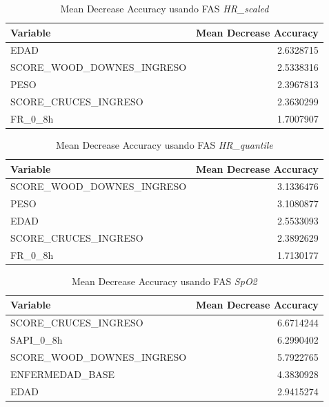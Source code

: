 \begin{table}[H]
    \centering
    \begin{tabular}{lr}
        \toprule
        \textbf{Variable} & \textbf{Mean Decrease Accuracy} \\
        \midrule
        EDAD & 2.6328715 \\
        SCORE\_WOOD\_DOWNES\_INGRESO & 2.5338316 \\
        PESO & 2.3967813 \\
        SCORE\_CRUCES\_INGRESO & 2.3630299 \\
        FR\_0\_8h & 1.7007907 \\
        \bottomrule
    \end{tabular}
    \caption{Mean Decrease Accuracy usando FAS \textit{HR\_scaled}}
\end{table}

\begin{table}[H]
    \centering
    \begin{tabular}{lr}
        \toprule
        \textbf{Variable} & \textbf{Mean Decrease Accuracy} \\
        \midrule
        SCORE\_WOOD\_DOWNES\_INGRESO & 3.1336476 \\
        PESO & 3.1080877 \\
        EDAD & 2.5533093 \\
        SCORE\_CRUCES\_INGRESO & 2.3892629 \\
        FR\_0\_8h & 1.7130177 \\
        \bottomrule
    \end{tabular}
    \caption{Mean Decrease Accuracy usando FAS \textit{HR\_quantile}} 
\end{table}

\begin{table}[H]
    \centering
    \begin{tabular}{lr}
        \toprule
        \textbf{Variable} & \textbf{Mean Decrease Accuracy} \\
        \midrule
        SCORE\_CRUCES\_INGRESO & 6.6714244 \\
        SAPI\_0\_8h & 6.2990402 \\
        SCORE\_WOOD\_DOWNES\_INGRESO & 5.7922765 \\
        ENFERMEDAD\_BASE & 4.3830928 \\
        EDAD & 2.9415274 \\
        \bottomrule
    \end{tabular}
    \caption{Mean Decrease Accuracy usando FAS \textit{SpO2}}
\end{table}

